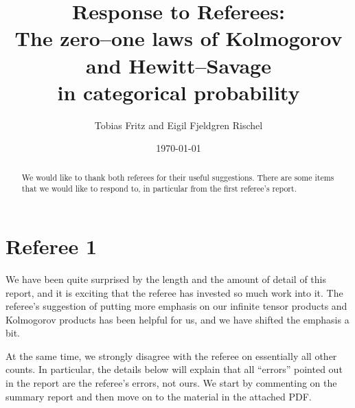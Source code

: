 \documentclass[11pt]{article}
\author{Tobias Fritz and Eigil Fjeldgren Rischel}
\title{Response to Referees:\\ The zero--one laws of Kolmogorov and Hewitt--Savage\\ in categorical probability}
\date{\today}
\begin{document}
\maketitle

\begin{abstract}
	We would like to thank both referees for their useful suggestions. There are some items that we would like to respond to, in particular from the first referee's report.
\end{abstract}

\section*{Referee 1}

We have been quite surprised by the length and the amount of detail of this report, and it is exciting that the referee has invested so much work into it. The referee's suggestion of putting more emphasis on our infinite tensor products and Kolmogorov products has been helpful for us, and we have shifted the emphasis a bit.

At the same time, we strongly disagree with the referee on essentially all other counts. In particular, the details below will explain that all ``errors'' pointed out in the report are the referee's errors, not ours. We start by commenting on the summary report and then move on to the material in the attached PDF.
\end{document}
